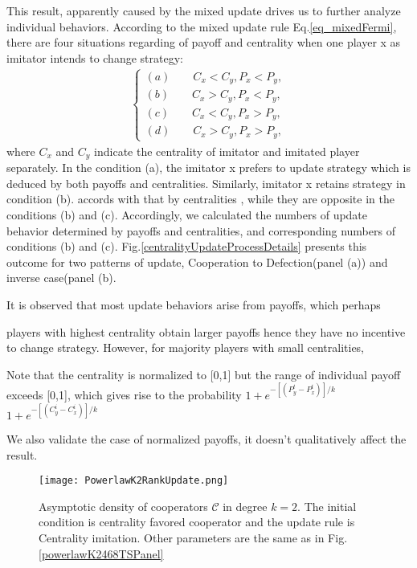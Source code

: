 \documentclass[preprint,12pt,3p]{elsarticle}
\begin{document}
This result, apparently caused by the mixed update drives us to further analyze individual behaviors.
According to the mixed update rule Eq.\ref{eq_mixedFermi}, there are four situations regarding of payoff and centrality when one player x as imitator intends to change strategy:
\begin{eqnarray}
\left\{
\begin{aligned}
(a)\qquad C_x<C_y,P_x<P_y,\\
(b)\qquad C_x>C_y,P_x<P_y,\\
(c)\qquad C_x<C_y,P_x>P_y,\\
(d)\qquad C_x>C_y,P_x>P_y,
\end{aligned}
\right.
\label{eq_mixedupdate_conditions}
\end{eqnarray}
where $C_x$ and $C_y$ indicate the centrality of imitator and imitated player separately.
In the condition (a), the imitator x prefers to update strategy which is deduced by both payoffs
and centralities. Similarly, imitator x retains strategy in condition (b).
 accords with that by centralities , while they are opposite in the conditions (b) and (c).
Accordingly, we calculated the numbers of update behavior determined by payoffs and centralities, and
corresponding numbers of conditions (b) and (c).
Fig.\ref{centralityUpdateProcessDetails} presents this outcome for two patterns of update, Cooperation to Defection(panel (a)) and inverse case(panel (b).

It is observed that most update behaviors arise from payoffs, which perhaps

players with highest centrality obtain larger payoffs hence they have no incentive to change strategy.
However, for majority players with small centralities,

Note that the centrality is normalized to [0,1] but the range of individual payoff exceeds [0,1],
which gives rise to the probability
$1+e^{-[(P_y^t-P_x^t)]/k}$
$1+e^{-[(C^i_y-C^i_x)]/k}$

We also validate the case of normalized payoffs, it doesn't qualitatively affect the result.


\begin{figure}[htbp]
\centering
\texttt{[image: PowerlawK2RankUpdate.png]}
\caption{Asymptotic density of cooperators $\mathcal{C}$ in degree $k=2$.
The initial condition is centrality favored cooperator and the update rule is Centrality imitation.
Other parameters are the same as in Fig.\ref{powerlawK2468TSPanel}}
\label{PowerlawK2RankUpdate}
\end{figure}
\end{document}
